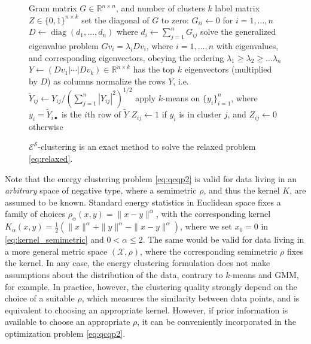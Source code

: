 \documentclass[aps,preprint,nofootinbib,floatfix]{revtex4-1}
\DeclareMathOperator{\diag}{diag}
\newcommand\kk{K}
\begin{document}
\begin{figure}
\begin{flushleft}
\begin{algorithm}[H]
\vspace{.5em}
\begin{algorithmic}[1]
\INPUT Gram matrix $G\in\mathbb{R}^{n\times n}$, and number of clusters $k$
\OUTPUT label matrix $Z \in \{ 0, 1\}^{n \times k}$
\STATE set the diagonal of $G$ to zero: $G_{ii} \leftarrow 0$ 
        for $i=1,\dotsc,n$
\STATE $D\leftarrow\diag(d_1,\dotsc,d_n)$ 
        where $d_i \leftarrow \sum_{j=1}^n G_{ij}$
\STATE solve the generalized eigenvalue problem $G v_i = \lambda_i D v_i$,
        where $i=1,\dotsc,n$ with eigenvalues, and corresponding eigenvectors,
        obeying the ordering
        $\lambda_1 \ge \lambda_2 \ge \dotsc \lambda_n$
\STATE $Y \leftarrow (D v_1| \dotsm | D v_k) 
        \in \mathbb{R}^{n\times k}$ 
has the top $k$ eigenvectors (multiplied by $D$) as columns
\STATE normalize the rows $Y$, i.e. 
$\widetilde{Y}_{ij} \leftarrow Y_{ij} \Big/ 
\left(\sum_{j=1}^n |Y_{ij}|^2\right)^{1/2}$
\STATE apply $k$-means on $\{ y_i \}_{i=1}^n$, 
where $y_i = \widetilde{Y}_{i\bullet}$
is the $i$th row of $\widetilde{Y}$
\STATE $Z_{ij} \leftarrow 1$ if $y_i$ is in cluster $j$, 
        and $Z_{ij} \leftarrow 0$ otherwise
\end{algorithmic}
\caption{
\label{spectralalgo}
$\mathcal{E^S}$-clustering is an exact method to solve
the relaxed problem \eqref{eq:relaxed}.
\hspace{\fill}
}
\end{algorithm}
\end{flushleft}
\end{figure}

Note that the energy clustering problem \eqref{eq:qcqp2} 
is valid for data living in an \emph{arbitrary} space of negative type, where
a semimetric $\rho$, and thus the kernel $\kk$, are
assumed to be known. Standard energy statistics in
Euclidean space fixes a family of choices 
$\rho_\alpha(x,y) = \| x - y\|^\alpha$, with the corresponding
kernel $K_\alpha(x,y) = \tfrac{1}{2} \left( \| x \|^\alpha + \| y \|^\alpha - 
\| x-y\|^\alpha \right)$, where we
set $x_0=0$ in \eqref{eq:kernel_semimetric} and  $0<\alpha\le 2$.
The same would be valid for data living in a more general
metric space $(\mathcal{X}, \rho)$, where the corresponding semimetric $\rho$ 
fixes the kernel.
In any case, the energy  clustering 
formulation does not make assumptions
about  the distribution of the data, 
contrary to $k$-means and GMM, for example.
In practice, however,
the clustering quality strongly depend on the choice of a suitable
$\rho$, which measures the similarity between data points,
and is equivalent to choosing an appropriate kernel.
However, if prior information is available to choose an appropriate $\rho$,
it can be conveniently incorporated in the 
optimization problem \eqref{eq:qcqp2}.
\end{document}
